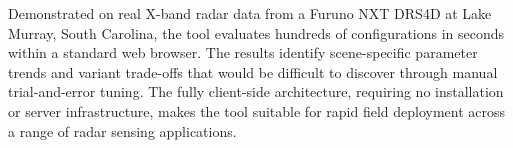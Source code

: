 \documentclass[conf]{new-aiaa}
\begin{document}
Demonstrated on real X-band radar data from a Furuno NXT DRS4D at Lake Murray, South Carolina, the tool evaluates hundreds of configurations in seconds within a standard web browser. The results identify scene-specific parameter trends and variant trade-offs that would be difficult to discover through manual trial-and-error tuning. The fully client-side architecture, requiring no installation or server infrastructure, makes the tool suitable for rapid field deployment across a range of radar sensing applications.



\end{document}
